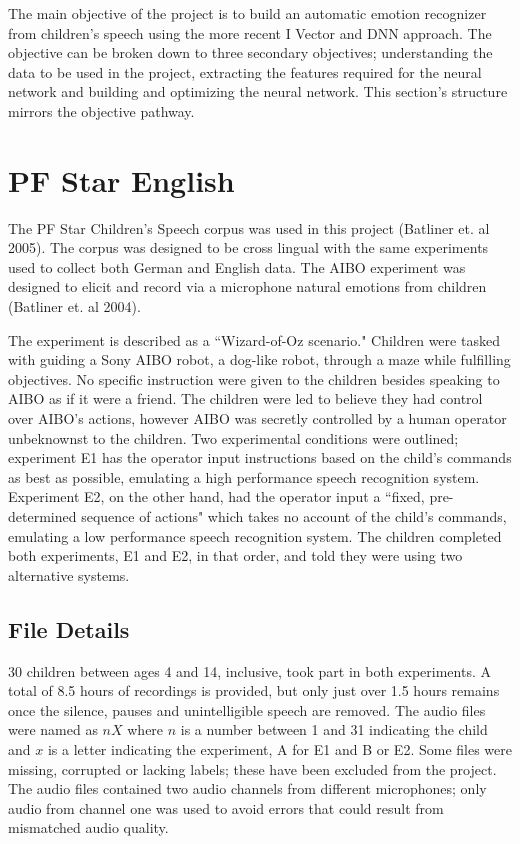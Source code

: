 	The main objective of the project is to build an automatic emotion recognizer from children's speech using the more recent I Vector and DNN approach. The objective can be broken down to three secondary objectives; understanding the data to be used in the project, extracting the features required for the neural network and building and optimizing the neural network. This section's structure mirrors the objective pathway.
\section{PF Star English}
	The PF Star Children's Speech corpus was used in this project (Batliner et. al 2005). The corpus was designed to be cross lingual with the same experiments used to collect both German and English data. The AIBO experiment was designed to elicit and record via a microphone natural emotions from children (Batliner et. al 2004).
	
	
	The experiment is described as a ``Wizard-of-Oz scenario." Children were tasked with guiding a Sony AIBO robot, a dog-like robot, through a maze while fulfilling objectives. No specific instruction were given to the children besides speaking to AIBO as if it were a friend. The children were led to believe they had control over AIBO's actions, however AIBO was secretly controlled by a human operator unbeknownst to the children. Two experimental conditions were outlined; experiment E1 has the operator input instructions based on the child's commands as best as possible, emulating a high performance speech recognition system. Experiment E2, on the other hand, had the operator input a ``fixed, pre-determined sequence of actions" which takes no account of the child's commands, emulating a low performance speech recognition system. The children completed both experiments, E1 and E2, in that order, and told they were using two alternative systems.
	
\subsection{File Details}
	30 children between ages 4 and 14, inclusive, took part in both experiments. A total of 8.5 hours of recordings is provided, but only just over 1.5 hours remains once the silence, pauses and unintelligible speech are removed. The audio files were named as $nX$ where $n$ is a number between 1 and 31 indicating the child and $x$ is a letter indicating the experiment, A for E1 and B or E2. Some files were missing, corrupted or lacking labels; these have been excluded from the project. The audio files contained two audio channels from different microphones; only audio from channel one was used to avoid errors that could result from mismatched audio quality.
	
